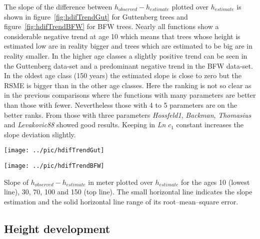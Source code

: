 \documentclass[a4paper,twocolumn]{article}
\begin{document}

The slope of the difference between $h_{observed} - h_{estimate}$
plotted over $h_{estimate}$ is shown in figure~\ref{fig:hdifTrendGut}
for Guttenberg trees and figure~\ref{fig:hdifTrendBFW} for BFW trees. Nearly
all functions show a considerable negative trend at age 10 which
means that trees whose height is estimated low are in reality bigger
and trees which are estimated to be big are in reality smaller. In
the higher age classes a slightly positive trend can be seen in the
Guttenberg data-set and a predominant negative trend in the BFW
data-set. In the oldest age class (150 years) the estimated slope is
close to zero but the RSME is bigger than in the other age
classes. Here the ranking is not so clear as in the previous
comparisons where the functions with many parameters are better than
those with fewer. Nevertheless those with 4 to 5 parameters are on the
better ranks. From those with three parameters \emph{Hossfeld1},
\emph{Backman}, \emph{Thomasius} and \emph{Levakovic88} showed good
results. Keeping in \emph{Ln} $c_1$ constant increases the slope
deviation slightly.

\begin{figure*}[htbp]
  \begin{minipage}{.49\linewidth}
    \centering
    \texttt{[image: ../pic/hdifTrendGut]}
    \caption{Trend on height difference with trees from Guttenberg}
    \label{fig:hdifTrendGut}
  \end{minipage}
  \begin{minipage}{.49\linewidth}
    \centering
    \texttt{[image: ../pic/hdifTrendBFW]}
    \caption{Trend on height difference with trees from BFW}
    \label{fig:hdifTrendBFW}
  \end{minipage}
  \scriptsize{Slope of $h_{observed} - h_{estimate}$  in meter plotted over
    $h_{estimate}$ for the ages 10 (lowest line), 30, 70, 100 and 150
    (top line). The small horizontal line indicates the slope
    estimation and the solid horizontal line range of its
    root--mean--square error.}
\end{figure*}


\subsection{Height development}
\end{document}
